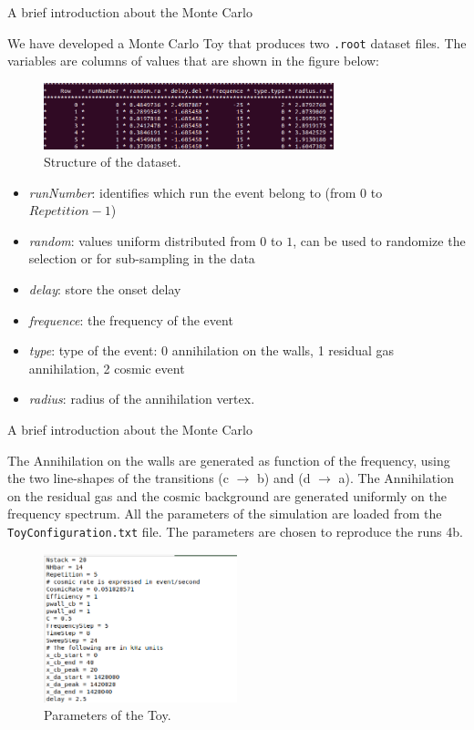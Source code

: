 \documentclass[9pt]{beamer}
\begin{document}
\begin{frame}{A brief introduction about the Monte Carlo}

We have developed a Monte Carlo Toy that produces two \texttt{.root} dataset files. The variables are columns of values that are shown in the figure below:
\begin{figure}[hbtp]
 \centering
 \includegraphics[width = 0.75\textwidth]{DatasetContent.png}
 \caption{ Structure of the dataset.}
 \end{figure}

\begin{itemize}
\item \textit{runNumber}: identifies which run the event belong to (from $0$ to $Repetition -1$) 
\item \textit{random}: values uniform distributed from $0$ to $1$, can be used to randomize the selection or for sub-sampling in the data
\item \textit{delay}: store the onset delay
\item \textit{frequence}: the frequency of the event
\item \textit{type}: type of the event: 0 annihilation on the walls, 1 residual gas annihilation, 2 cosmic event
\item \textit{radius}: radius of the annihilation vertex.
\end{itemize}

\end{frame}

\begin{frame}{A brief introduction about the Monte Carlo}

The Annihilation on the walls are generated as function of the frequency, using the two line-shapes of the transitions (c $\rightarrow$ b) and (d $\rightarrow$ a). The Annihilation on the residual gas and the cosmic background are generated uniformly on the frequency spectrum. All the parameters of the simulation are loaded from the \texttt{ToyConfiguration.txt} file. The parameters are chosen to reproduce the runs 4b.

\begin{figure}[hbtp]
\centering
\includegraphics[width = 0.5\textwidth]{MontecarloParams.png}
\caption{ Parameters of the Toy.}
\end{figure}
\end{frame}
\end{document}
